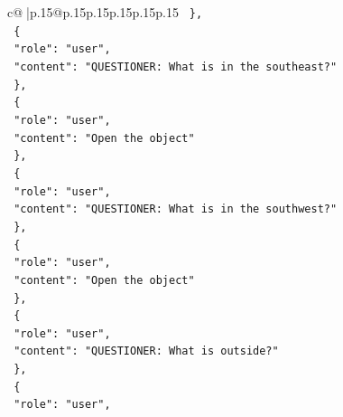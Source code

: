 \documentclass{article}
\begin{document}
{\begin{supertabular}{c@{$\;$}|p{.15\linewidth}@{}p{.15\linewidth}p{.15\linewidth}p{.15\linewidth}p{.15\linewidth}p{.15\linewidth}}
{{{\texttt{  \},} \\
\texttt{  \{} \\
\texttt{    "role": "user",} \\
\texttt{    "content": "QUESTIONER: What is in the southeast?"} \\
\texttt{  \},} \\
\texttt{  \{} \\
\texttt{    "role": "user",} \\
\texttt{    "content": "Open the object"} \\
\texttt{  \},} \\
\texttt{  \{} \\
\texttt{    "role": "user",} \\
\texttt{    "content": "QUESTIONER: What is in the southwest?"} \\
\texttt{  \},} \\
\texttt{  \{} \\
\texttt{    "role": "user",} \\
\texttt{    "content": "Open the object"} \\
\texttt{  \},} \\
\texttt{  \{} \\
\texttt{    "role": "user",} \\
\texttt{    "content": "QUESTIONER: What is outside?"} \\
\texttt{  \},} \\
\texttt{  \{} \\
\texttt{    "role": "user",} \\
}}}
\end{supertabular}}
\end{document}
